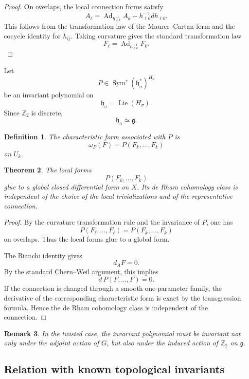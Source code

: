 \documentclass[11pt]{amsart}
\newtheorem{definition}{Definition}[section]
\newtheorem{theorem}[definition]{Theorem}
\newtheorem{remark}[definition]{Remark}
\begin{document}
\begin{proof}
On overlaps, the local connection forms satisfy
\[
A_\ell
=
\operatorname{Ad}_{h_{\ell k}^{-1}}A_k
+
h_{\ell k}^{-1}dh_{\ell k}.
\]
This follows from the transformation law of the Maurer--Cartan form and the cocycle identity for \(h_{ij}\). Taking curvature gives the standard transformation law
\[
F_\ell
=
\operatorname{Ad}_{h_{\ell k}^{-1}}F_k.
\]
\end{proof}

Let
\[
P\in \operatorname{Sym}^r(\mathfrak h_\sigma^*)^{H_\sigma}
\]
be an invariant polynomial on
\[
\mathfrak h_\sigma=\operatorname{Lie}(H_\sigma).
\]
Since \(\mathbb Z_2\) is discrete,
\[
\mathfrak h_\sigma\simeq \mathfrak g.
\]

\begin{definition}
The characteristic form associated with \(P\) is
\[
\omega_P(F)
=
P(F_k,\ldots,F_k)
\]
on \(U_k\).
\end{definition}

\begin{theorem}
The local forms
\[
P(F_k,\ldots,F_k)
\]
glue to a global closed differential form on \(X\). Its de Rham cohomology class is independent of the choice of the local trivializations and of the representative connection.
\end{theorem}

\begin{proof}
By the curvature transformation rule and the invariance of \(P\), one has
\[
P(F_\ell,\ldots,F_\ell)
=
P(F_k,\ldots,F_k)
\]
on overlaps. Thus the local forms glue to a global form.

The Bianchi identity gives
\[
d_A F=0.
\]
By the standard Chern--Weil argument, this implies
\[
d\,P(F,\ldots,F)=0.
\]
If the connection is changed through a smooth one-parameter family, the derivative of the corresponding characteristic form is exact by the transgression formula. Hence the de Rham cohomology class is independent of the connection.
\end{proof}

\begin{remark}
In the twisted case, the invariant polynomial must be invariant not only under the adjoint action of \(G\), but also under the induced action of \(\mathbb Z_2\) on \(\mathfrak g\).
\end{remark}

\subsection{Relation with known topological invariants}
\end{document}
